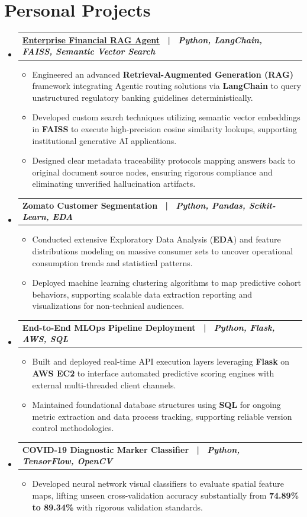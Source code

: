 \documentclass[letterpaper,11pt]{article}
\makeatletter
\newcommand{\resumeItem}[1]{
  \item\small{
    {#1 \vspace{-3pt}}
  }
}
\newcommand{\resumeProjectHeading}[2]{
  \vspace{-3pt}\item
    \begin{tabular*}{1.0\textwidth}[t]{l@{\extracolsep{\fill}}r}
      \textbf{#1} & \textbf{\small #2} \\
    \end{tabular*}\vspace{-7pt}
}
\newcommand{\resumeSubHeadingListStart}{\begin{itemize}[leftmargin=0.0in, label={}]}
\newcommand{\resumeSubHeadingListEnd}{\end{itemize}}
\newcommand{\resumeItemListStart}{\begin{itemize}}
\newcommand{\resumeItemListEnd}{\end{itemize}\vspace{0pt}}
\makeatother
\begin{document}
\section{Personal Projects}
  \resumeSubHeadingListStart
    \resumeProjectHeading
      {\href{https://github.com/Abhinavvamsi/financial-rag-agent}{\textbf{Enterprise Financial RAG Agent}} ~|~ \textit{Python, LangChain, FAISS, Semantic Vector Search}}{}
      \resumeItemListStart
        \resumeItem{Engineered an advanced \textbf{Retrieval-Augmented Generation (RAG)} framework integrating Agentic routing solutions via \textbf{LangChain} to query unstructured regulatory banking guidelines deterministically.}
        \resumeItem{Developed custom search techniques utilizing semantic vector embeddings in \textbf{FAISS} to execute high-precision cosine similarity lookups, supporting institutional generative AI applications.}
        \resumeItem{Designed clear metadata traceability protocols mapping answers back to original document source nodes, ensuring rigorous compliance and eliminating unverified hallucination artifacts.}
      \resumeItemListEnd

    \resumeProjectHeading
      {\textbf{Zomato Customer Segmentation} ~|~ \textit{Python, Pandas, Scikit-Learn, EDA}}{}
      \resumeItemListStart
        \resumeItem{Conducted extensive Exploratory Data Analysis (\textbf{EDA}) and feature distributions modeling on massive consumer sets to uncover operational consumption trends and statistical patterns.}
        \resumeItem{Deployed machine learning clustering algorithms to map predictive cohort behaviors, supporting scalable data extraction reporting and visualizations for non-technical audiences.}
      \resumeItemListEnd

    \resumeProjectHeading
      {\textbf{End-to-End MLOps Pipeline Deployment} ~|~ \textit{Python, Flask, AWS, SQL}}{}
      \resumeItemListStart
        \resumeItem{Built and deployed real-time API execution layers leveraging \textbf{Flask} on \textbf{AWS EC2} to interface automated predictive scoring engines with external multi-threaded client channels.}
        \resumeItem{Maintained foundational database structures using \textbf{SQL} for ongoing metric extraction and data process tracking, supporting reliable version control methodologies.}
      \resumeItemListEnd

    \resumeProjectHeading
      {\textbf{COVID-19 Diagnostic Marker Classifier} ~|~ \textit{Python, TensorFlow, OpenCV}}{}
      \resumeItemListStart
        \resumeItem{Developed neural network visual classifiers to evaluate spatial feature maps, lifting unseen cross-validation accuracy substantially from \textbf{74.89\% to 89.34\%} with rigorous validation standards.}
      \resumeItemListEnd
  \resumeSubHeadingListEnd
\end{document}
